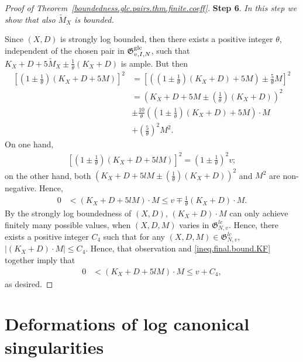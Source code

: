 \documentclass[12pt, a4paper]{amsart}
\newcommand{\setgenpair}[1]{\mathfrak G^{#1}_{N,v}}
\newcommand{\setgpairsdcc}[1]{\mathfrak G^{\rm g#1}_{v, I, N}}
\newcounter{Theorem}
\theoremstyle{definition}
\theoremstyle{named}
\begin{document}
\begin{proof}[Proof of Theorem~\ref{boundedness.glc.pairs.thm.finite.coeff}]
{\bf Step 6}.
{\it In this step we show that also 
$\widetilde{M}_X$ is bounded.}

Since $(X, D)$ is strongly log bounded, 
then there exists 
a positive integer 
$\theta$, 
independent of the chosen pair in 
$\setgpairsdcc{lc}$, 
such that 
$K_X+D+5\widetilde{M}_X
\pm
\frac 1 \theta (K_X+D)
$
is ample.
But then 
\begin{align*}
\left [ 
\left (
1\pm \frac 1 \theta 
\right ) 
\left (
K_X+D+5M 
\right ) 
\right ]^2 
& = 
\left [ 
\left ( 
\left (
1\pm \frac 1 \theta 
\right ) 
\left (
K_X+D 
\right )
+5M 
\right )
\pm \frac{5}{\theta} M 
\right ]^2
\\
& =
 \left ( 
 K_X+D +5M
 \pm
 \left (
\frac 1 \theta
 \right )
 \left (
K_X+D
 \right)
 \right )^2 \\
& \pm
\frac{10}{\theta}  
\left ( 
\left (
1 \pm \frac 1 \theta 
\right ) 
\left (
K_X+D 
\right )
+5M 
\right )
\cdot 
M
\\
& +  
\left (
\frac{5}{\theta} 
\right )^2 
M^2.
\end{align*}
On one hand, 
\begin{align*}
    \left [ 
    \left (
    1\pm \frac 1 \theta 
    \right ) 
    \left (
K_X+D+5lM 
\right ) 
\right ]^2
    = 
    \left (
    1\pm \frac 1 \theta 
    \right ) ^2 v;
\end{align*}
on the other hand, 
both 
$ \left ( 
 K_X+D +5lM
 \pm \left (
\frac 1 \theta
 \right )
 \left (
K_X+D
 \right)
 \right )^2$
 and 
 $M^2$
 are non-negative.
 Hence, 
 \begin{align}
 \label{ineq.final.bound.KF}
   0 
   & <
   \left (
   K_X+D 
   +5lM 
   \right )
   \cdot 
   M
   \leq 
   v \mp \frac 1 \theta (K_X+D)\cdot M.
 \end{align}
 By the strongly log boundedness of 
 $(X, D)$, 
 $(K_X+D)\cdot M$
 can only achieve finitely many possible values, when 
 $(X, D, M)$
 varies in 
 $\setgenpair{lc}$.
 Hence, there exists a positive integer 
 $C_4$ such that 
 for any 
 $(X, D, M)
 \in 
 \setgenpair{lc}$, 
 $\vert(K_X+D)\cdot M \vert \leq C_4$.
 Hence, that observation and \eqref{ineq.final.bound.KF} 
 together imply that 
 \begin{align*}
     0 
   & <
   \left (
   K_X+D 
   +5lM 
   \right )
   \cdot 
   M
   \leq 
   v +C_4,
 \end{align*}
 as desired.
\end{proof}


\section{Deformations of log canonical singularities}
\end{document}
